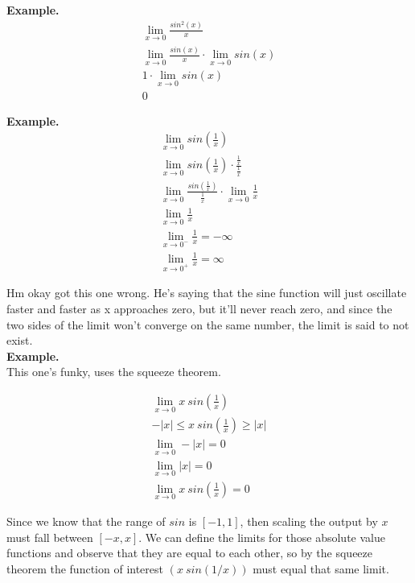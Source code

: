 \documentclass{article}
\begin{document}
\textbf{Example.}\\

\begin{align*}
    \lim_{x\to 0} \frac{sin^2(x)}{x}\\
    \lim_{x\to 0} \frac{sin(x)}{x} \cdot \lim_{x\to 0} sin(x)\\
    1 \cdot \lim_{x\to 0} sin(x)\\
    0
\end{align*}

\textbf{Example.}\\

\begin{align*}
    \lim_{x\to 0} sin(\frac{1}{x})\\
    \lim_{x\to 0} sin(\frac{1}{x}) \cdot \frac{\frac{1}{x}}{\frac{1}{x}}\\
    \lim_{x\to 0} \frac{sin(\frac{1}{x})}{\frac{1}{x}} \cdot \lim_{x\to 0} \frac{1}{x}\\
    \lim_{x\to 0} \frac{1}{x}\\
    \lim_{x\to 0^-} \frac{1}{x} = -\infty\\
    \lim_{x \to 0^+} \frac{1}{x} = \infty
\end{align*}

Hm okay got this one wrong. He's saying that the sine function will just oscillate faster
and faster as x approaches zero, but it'll never reach zero, and since the two sides of
the limit won't converge on the same number, the limit is said to not exist.\\

\textbf{Example.}\\

This one's funky, uses the squeeze theorem.

\begin{align*}
    \lim_{x\to 0} x~sin(\frac{1}{x})\\
    -\lvert x \rvert \leq x~sin(\frac{1}{x}) \geq \lvert x \rvert\\
    \lim_{x\to 0} - \lvert x \rvert = 0\\
    \lim_{x\to 0} \lvert x \rvert = 0\\
    \lim_{x\to 0} x~sin(\frac{1}{x}) = 0
\end{align*}

Since we know that the range of $sin$ is $[-1, 1]$, then scaling the output by $x$ must
fall between $[-x, x]$. We can define the limits for those absolute value functions and
observe that they are equal to each other, so by the squeeze theorem the function of
interest $(x~sin(1/x))$ must equal that same limit.\\
\end{document}
